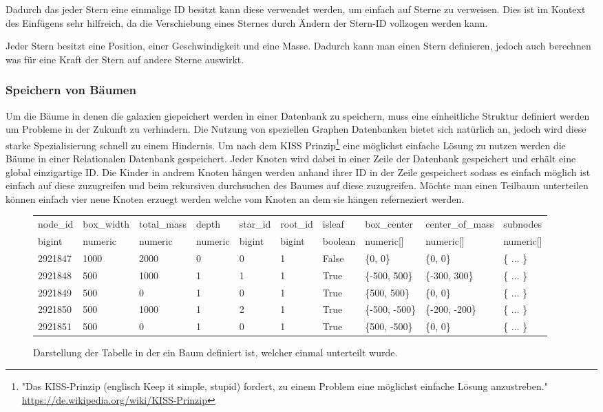 Dadurch das jeder Stern eine einmalige ID besitzt kann diese verwendet werden, um einfach auf Sterne zu verweisen. Dies ist im Kontext des Einfügens sehr hilfreich, da die Verschiebung eines Sternes durch Ändern der Stern-ID vollzogen
werden kann.

\par Jeder Stern besitzt eine Position, einer Geschwindigkeit und eine Masse.
Dadurch kann man einen Stern definieren, jedoch auch berechnen was für eine
Kraft der Stern auf andere Sterne auswirkt.

\subsubsection{Speichern von Bäumen}
Um die Bäume in denen die galaxien giepeichert werden in einer Datenbank zu
speichern, muss eine einheitliche Struktur definiert werden um Probleme in der
Zukunft zu verhindern. Die Nutzung von speziellen Graphen Datenbanken bietet
sich natürlich an, jedoch wird diese starke Spezialisierung schnell zu einem
Hindernis. Um nach dem KISS Prinzip\footnote{"Das KISS-Prinzip (englisch Keep
it simple, stupid) fordert, zu einem Problem eine möglichst einfache Lösung
anzustreben." \url{https://de.wikipedia.org/wiki/KISS-Prinzip}} eine möglichst
einfache Lösung zu nutzen werden die Bäume in einer Relationalen Datenbank
gespeichert. Jeder Knoten wird dabei in einer Zeile der Datenbank gespeichert
und erhält eine global einzigartige ID. Die Kinder in andrem Knoten hängen
werden anhand ihrer ID in der Zeile gespeichert sodass es einfach möglich ist
einfach auf diese zuzugreifen und beim rekursiven durchsuchen des Baumes auf
diese zuzugreifen. Möchte man einen Teilbaum unterteilen können einfach vier
neue Knoten erzuegt werden welche vom Knoten an dem sie hängen referneziert
werden.

\begin{figure*}[ht]
\begin{tabular} {l | l | l | l | l | l | l | l | l | l}
node\_id & box\_width & total\_mass & depth & star\_id & root\_id & isleaf & box\_center & center\_of\_mass & subnodes  \\ 
bigint & numeric & numeric & numeric & bigint & bigint & boolean & numeric[] & numeric[] & numeric[]  \\ \hline\hline
2921847 & 1000 & 2000 & 0 & 0 & 1 & False & \{0, 0\}       & \{0, 0\}       & \{ \(\dots\) \}  \\ \hline
2921848 & 500  & 1000 & 1 & 1 & 1 & True  & \{-500, 500\}  & \{-300, 300\}  & \{ \(\dots\) \}  \\ \hline
2921849 & 500  & 0    & 1 & 0 & 1 & True  & \{500, 500\}   & \{0, 0\}       & \{ \(\dots\) \}  \\ \hline
2921850 & 500  & 1000 & 1 & 2 & 1 & True  & \{-500, -500\} & \{-200, -200\} & \{ \(\dots\) \}  \\ \hline
2921851 & 500  & 0    & 1 & 0 & 1 & True  & \{500, -500\}  & \{0, 0\}       & \{ \(\dots\) \}  \\ \hline
\end{tabular}
\caption{Darstellung der Tabelle in der ein Baum definiert ist, welcher einmal unterteilt wurde.}
\end{figure*}


